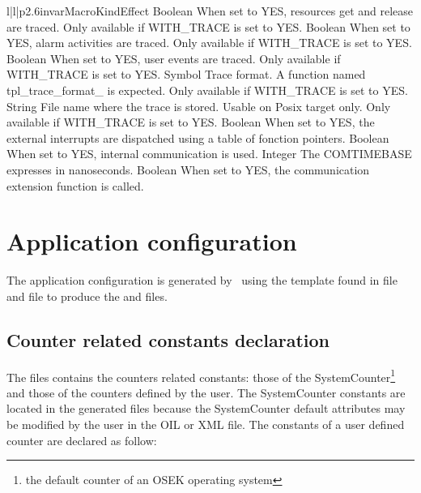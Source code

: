 \begin{longtableiii}{l|l|p{2.6in}}{var}{Macro}{Kind}{Effect}
  {Boolean}
  {When set to YES, resources get and release are traced. Only available if WITH_TRACE is set to YES.}
  {Boolean}
  {When set to YES, alarm activities are traced. Only available if WITH_TRACE is set to YES.}
  {Boolean}
  {When set to YES, user events are traced. Only available if WITH_TRACE is set to YES.}
  {Symbol}
  {Trace format. A function named tpl_trace_format_ is expected. Only available if WITH_TRACE is set to YES.}
  {String}
  {File name where the trace is stored. Usable on Posix target only. Only available if WITH_TRACE is set to YES.}
  {Boolean}
  {When set to YES, the external interrupts are dispatched using a table of fonction pointers.}
  {Boolean}
  {When set to YES, internal communication is used.}
  {Integer}
  {The COMTIMEBASE expresses in nanoseconds.}
  {Boolean}
  {When set to YES, the communication extension function is called.}
\end{longtableiii}

\section{Application configuration}

The application configuration is generated by \goil\ using the template found in  file and  file to produce the  and  files.

\subsection{Counter related constants declaration}

The  files contains the counters related constants: those of the SystemCounter\footnote{the default counter of an OSEK operating system} and those of the counters defined by the user. The SystemCounter constants are located in the generated files because the SystemCounter default attributes may be modified by the user in the OIL or XML file. The constants of a user defined counter are declared as follow:

